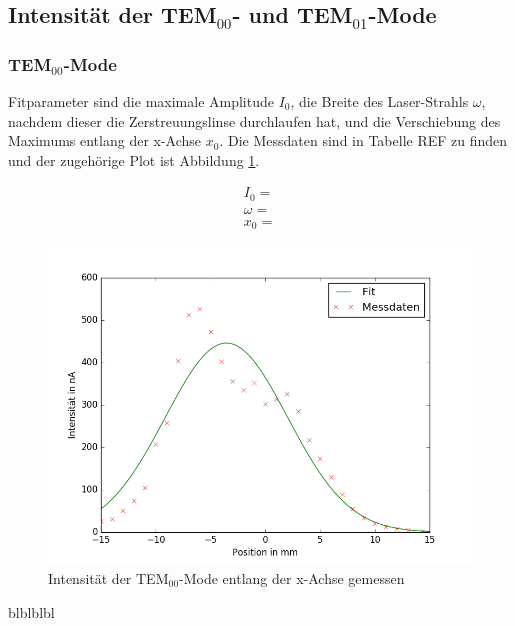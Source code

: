 \subsection{Intensität der TEM$_{00}$- und TEM$_{01}$-Mode}
\subsubsection{TEM$_{00}$-Mode}

Fitparameter sind die maximale Amplitude $I_0$, die Breite des Laser-Strahls $\omega$, nachdem dieser die Zerstreuungslinse durchlaufen hat, und die Verschiebung des Maximums entlang der x-Achse $x_0$. Die Messdaten sind in Tabelle REF zu finden und der zugehörige Plot ist Abbildung \ref{fig:TEM_00}.

\begin{align}
	I_0 =  \\
	\omega =   \\
	x_0 = 
\end{align}
	
 


\begin{figure}[h!]
	\centering
	\includegraphics[width=.6\textwidth]{build/TEM_00.png}
	\caption{Intensität der TEM$_{00}$-Mode entlang der x-Achse gemessen}
	\label{fig:TEM_00}
\end{figure} 

blblblbl